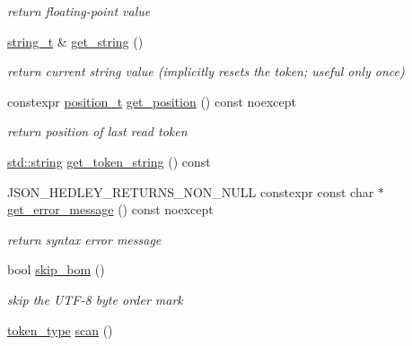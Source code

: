 \begin{DoxyCompactItemize}
\begin{DoxyCompactList}\small\item\em return floating-\/point value \end{DoxyCompactList}\item 
\hyperlink{classnlohmann_1_1detail_1_1lexer_ab63d35c658887592a4b09ad26eb4c795}{string\+\_\+t} \& \hyperlink{classnlohmann_1_1detail_1_1lexer_a54aa290ff2f60218a8f35f1ebf81666d}{get\+\_\+string} ()
\begin{DoxyCompactList}\small\item\em return current string value (implicitly resets the token; useful only once) \end{DoxyCompactList}\item 
constexpr \hyperlink{structnlohmann_1_1detail_1_1position__t}{position\+\_\+t} \hyperlink{classnlohmann_1_1detail_1_1lexer_abf5143501435f9f79898c1ff238c2622}{get\+\_\+position} () const noexcept
\begin{DoxyCompactList}\small\item\em return position of last read token \end{DoxyCompactList}\item 
\hyperlink{namespacenlohmann_1_1detail_a1ed8fc6239da25abcaf681d30ace4985ab45cffe084dd3d20d928bee85e7b0f21}{std\+::string} \hyperlink{classnlohmann_1_1detail_1_1lexer_a4aef7e72e539be04e139c34872421f2a}{get\+\_\+token\+\_\+string} () const
\item 
J\+S\+O\+N\+\_\+\+H\+E\+D\+L\+E\+Y\+\_\+\+R\+E\+T\+U\+R\+N\+S\+\_\+\+N\+O\+N\+\_\+\+N\+U\+LL constexpr const char $\ast$ \hyperlink{classnlohmann_1_1detail_1_1lexer_a3cead908f797ffa091bb67e90985739d}{get\+\_\+error\+\_\+message} () const noexcept
\begin{DoxyCompactList}\small\item\em return syntax error message \end{DoxyCompactList}\item 
bool \hyperlink{classnlohmann_1_1detail_1_1lexer_a709afd52def2e258dac0b8a67dc4ea26}{skip\+\_\+bom} ()
\begin{DoxyCompactList}\small\item\em skip the U\+T\+F-\/8 byte order mark \end{DoxyCompactList}\item 
\hyperlink{classnlohmann_1_1detail_1_1lexer_a3f313cdbe187cababfc5e06f0b69b098}{token\+\_\+type} \hyperlink{classnlohmann_1_1detail_1_1lexer_aac3041cd2b9291e64fee38db422863c9}{scan} ()
\end{DoxyCompactItemize}
